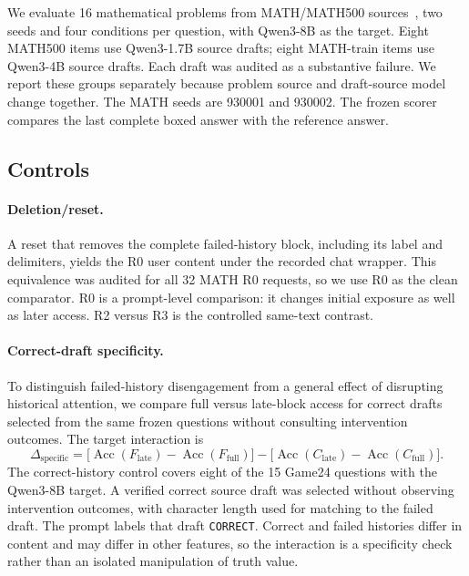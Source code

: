 \documentclass{article}
\begin{document}
We evaluate 16 mathematical problems from MATH/MATH500 sources~\citep{hendrycks2021math}, two seeds and four conditions per question, with Qwen3-8B as the target. Eight MATH500 items use Qwen3-1.7B source drafts; eight MATH-train items use Qwen3-4B source drafts. Each draft was audited as a substantive failure. We report these groups separately because problem source and draft-source model change together. The MATH seeds are 930001 and 930002. The frozen scorer compares the last complete boxed answer with the reference answer.

\subsection{Controls}

\paragraph{Deletion/reset.}
A reset that removes the complete failed-history block, including its label and delimiters, yields the R0 user content under the recorded chat wrapper. This equivalence was audited for all 32 MATH R0 requests, so we use R0 as the clean comparator. R0 is a prompt-level comparison: it changes initial exposure as well as later access. R2 versus R3 is the controlled same-text contrast.

\paragraph{Correct-draft specificity.}
To distinguish failed-history disengagement from a general effect of disrupting historical attention, we compare full versus late-block access for correct drafts selected from the same frozen questions without consulting intervention outcomes. The target interaction is
\begin{equation}
    \Delta_{\mathrm{specific}}
    = \big[\operatorname{Acc}(F_{\mathrm{late}})-\operatorname{Acc}(F_{\mathrm{full}})\big]
    - \big[\operatorname{Acc}(C_{\mathrm{late}})-\operatorname{Acc}(C_{\mathrm{full}})\big].
\end{equation}
The correct-history control covers eight of the 15 Game24 questions with the Qwen3-8B target. A verified correct source draft was selected without observing intervention outcomes, with character length used for matching to the failed draft. The prompt labels that draft \texttt{CORRECT}. Correct and failed histories differ in content and may differ in other features, so the interaction is a specificity check rather than an isolated manipulation of truth value.
\end{document}
